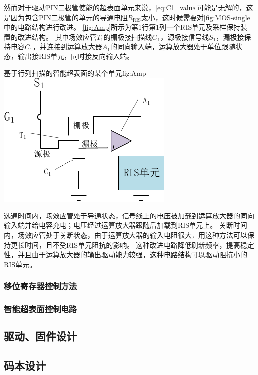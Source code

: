 \documentclass[supercite]{HustGraduPaper}
\begin{document}
然而对于驱动PIN二极管使能的超表面单元来说，\autoref{eq:C1_value}可能是无解的，这是因为包含PIN二极管的单元的导通电阻$R_\mathrm{RIS}$太小，这时候需要对\autoref{fig:MOS-single}中的电路结构进行改进。
\autoref{fig:Amp}所示为第1行第1列一个RIS单元及采样保持装置的改进结构。
其中场效应管$T_1$的栅极接扫描线$G_1$，源极接信号线$S_1$，漏极接保持电容$C_1$，并连接到运算放大器$A_1$的同向输入端，运算放大器处于单位跟随状态，输出接RIS单元，同时接反向输入端。

\begin{generalfig}[htb]{基于行列扫描的智能超表面的某个单元}{fig:Amp}
	\includegraphics[width=0.5\linewidth]{Figures/Amp.pdf}
\end{generalfig}

选通时间内，场效应管处于导通状态，信号线上的电压被加载到运算放大器的同向输入端并给电容充电；电压经过运算放大器跟随后加载到RIS单元上。
关断时间内，场效应管处于关断状态，由于运算放大器的输入电阻很大，用这种方法可以保持更长时间，且不受RIS单元阻抗的影响。
这种改进电路降低刷新频率，提高稳定性，并且由于运算放大器的输出驱动能力较强，这种电路结构可以驱动阻抗小的RIS单元。

\subsubsection{移位寄存器控制方法}



\subsubsection{智能超表面控制电路}

\subsection{驱动、固件设计}


\subsection{码本设计}
\end{document}
